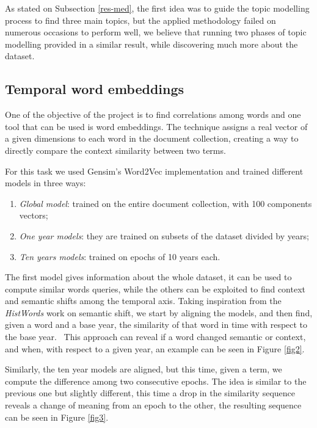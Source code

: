 As stated on Subsection \vref{res-med}, the first idea was to guide the topic modelling
process to find three main topics, but the applied methodology failed on numerous occasions to 
perform well, we believe that running two phases of topic modelling provided in a similar result, 
while discovering much more about the dataset. 

\subsection{Temporal word embeddings}

One of the objective of the project is to find correlations among words and one tool 
that can be used is word embeddings. The technique assigns a real vector of a given dimensions
to each word in the document collection, creating a way to directly compare the context 
similarity between two terms.

For this task we used Gensim's Word2Vec implementation and trained different models 
in three ways:
\begin{enumerate}
    \item \emph{Global model}: trained on the entire document collection, with 100 components vectors;
    \item \emph{One year models}: they are trained on subsets of the dataset divided by years;
    \item \emph{Ten years models}: trained on epochs of 10 years each.
\end{enumerate}
The first model gives information about the whole dataset, it can be used to compute 
similar words queries, while the others can be exploited to find context and semantic shifts 
among the temporal axis.
Taking inspiration from the \emph{HistWords} work on semantic shift, we start by aligning the models, 
and then find, given a word and a base year, the similarity of that word in time with respect 
to the base year.~\cite{hist-words} This approach can reveal if a word changed semantic or context, and when, 
with respect to a given year, an example can be seen in Figure \vref{fig2}.

Similarly, the ten year models are aligned, but this time, given a term, we compute the 
difference among two consecutive epochs. The idea is similar to the previous one but slightly 
different, this time a drop in the similarity sequence 
reveals a change of meaning from an epoch to the other, the resulting 
sequence can be seen in Figure \vref{fig3}.

